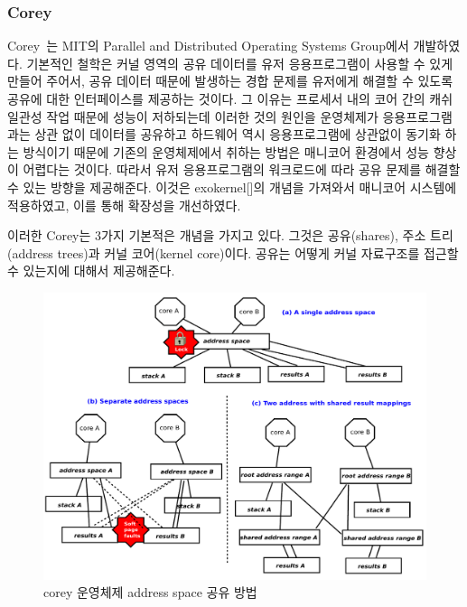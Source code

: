 \subsubsection{Corey}

Corey~\cite{Boyd-WickizerCorey}는 MIT의 Parallel and Distributed Operating Systems
Group에서 개발하였다.
기본적인 철학은 커널 영역의 공유 데이터를 유저 응용프로그램이 사용할 수 있게 만들어 주어서, 
공유 데이터 때문에 발생하는 경합 문제를 유저에게 해결할 수 있도록 공유에 대한 인터페이스를 제공하는 것이다. 
그 이유는 프로세서 내의 코어 간의 캐쉬 일관성 작업 때문에 성능이 저하되는데 이러한 것의 원인을 
운영체제가 응용프로그램과는 상관 없이 데이터를 공유하고 하드웨어 역시 응용프로그램에 상관없이 동기화 하는 
방식이기 때문에 기존의 운영체제에서 취하는 방법은 매니코어 환경에서 성능 향상이 어렵다는 것이다.  
따라서 유저 응용프로그램의 워크로드에 따라 공유 문제를 해결할 수 있는 방향을 제공해준다.
이것은 exokernel[]의 개념을 가져와서 매니코어 시스템에 적용하였고, 이를 통해 확장성을 개선하였다.

이러한 Corey는 3가지 기본적은 개념을 가지고 있다. 그것은 공유(shares), 주소 트리(address trees)과 커널
코어(kernel core)이다.
공유는 어떻게 커널 자료구조를 접근할 수 있는지에 대해서 제공해준다.

\begin{figure}[h!]
    \centering
    \includegraphics[width=1\textwidth]{fig/corey/corey}
    \caption{corey 운영체제 address space 공유 방법}
  \label{fig:corey}
\end{figure}

